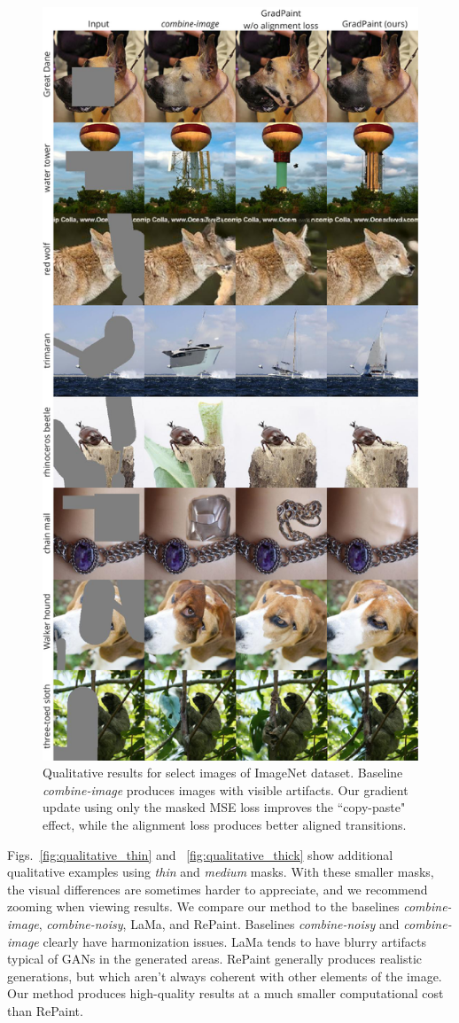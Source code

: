 \begin{figure}[H]
  \centering
    \includegraphics[width=0.75\linewidth]{images/gradpaint/vis_ablation.pdf}
    \caption{Qualitative results for select images of ImageNet dataset. Baseline \emph{combine-image} produces  images with visible artifacts. Our gradient update using only the masked MSE loss improves the ``copy-paste" effect, while the alignment loss produces better aligned transitions.}
    \label{fig:vis_ablation}
\end{figure}



Figs.~\ref{fig:qualitative_thin} and ~\ref{fig:qualitative_thick} show additional qualitative examples using
 \emph{thin} and \emph{medium} masks. With these smaller masks, the visual differences are sometimes harder to 
 appreciate, and we recommend zooming when viewing results. We compare our method to the baselines 
 \emph{combine-image}, \emph{combine-noisy}, LaMa, and RePaint. Baselines \emph{combine-noisy} and
  \emph{combine-image} clearly have harmonization issues. LaMa tends to have blurry artifacts typical of
   GANs in the generated areas. RePaint generally produces realistic generations, but which aren't always
    coherent with other elements of the image. Our method produces high-quality results at a much smaller
     computational cost than RePaint.


